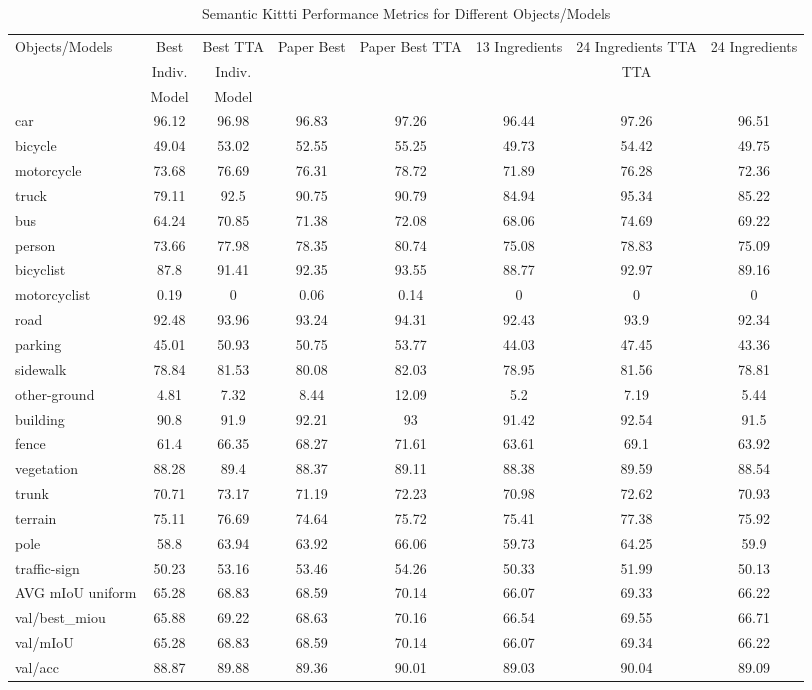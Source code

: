 \documentclass[10pt,twocolumn,letterpaper]{article}
\begin{document}
\begin{table}[htbp]
\centering
\small
	\caption{Semantic Kittti Performance Metrics for Different Objects/Models}
	\begin{tabular}{lccccccc}
		\toprule
		Objects/Models & Best & Best TTA & Paper Best & Paper Best TTA & 13 Ingredients & 24 Ingredients TTA & 24 Ingredients \\
		& Indiv. & Indiv. & & & & TTA & \\
		& Model & Model & & & & & \\
		\midrule
		car & 96.12 & 96.98 & 96.83 & 97.26 & 96.44 & 97.26 & 96.51 \\
		bicycle & 49.04 & 53.02 & 52.55 & 55.25 & 49.73 & 54.42 & 49.75 \\
		motorcycle & 73.68 & 76.69 & 76.31 & 78.72 & 71.89 & 76.28 & 72.36 \\
		truck & 79.11 & 92.5 & 90.75 & 90.79 & 84.94 & 95.34 & 85.22 \\
		bus & 64.24 & 70.85 & 71.38 & 72.08 & 68.06 & 74.69 & 69.22 \\
		person & 73.66 & 77.98 & 78.35 & 80.74 & 75.08 & 78.83 & 75.09 \\
		bicyclist & 87.8 & 91.41 & 92.35 & 93.55 & 88.77 & 92.97 & 89.16 \\
		motorcyclist & 0.19 & 0 & 0.06 & 0.14 & 0 & 0 & 0 \\
		road & 92.48 & 93.96 & 93.24 & 94.31 & 92.43 & 93.9 & 92.34 \\
		parking & 45.01 & 50.93 & 50.75 & 53.77 & 44.03 & 47.45 & 43.36 \\
		sidewalk & 78.84 & 81.53 & 80.08 & 82.03 & 78.95 & 81.56 & 78.81 \\
		other-ground & 4.81 & 7.32 & 8.44 & 12.09 & 5.2 & 7.19 & 5.44 \\
		building & 90.8 & 91.9 & 92.21 & 93 & 91.42 & 92.54 & 91.5 \\
		fence & 61.4 & 66.35 & 68.27 & 71.61 & 63.61 & 69.1 & 63.92 \\
		vegetation & 88.28 & 89.4 & 88.37 & 89.11 & 88.38 & 89.59 & 88.54 \\
		trunk & 70.71 & 73.17 & 71.19 & 72.23 & 70.98 & 72.62 & 70.93 \\
		terrain & 75.11 & 76.69 & 74.64 & 75.72 & 75.41 & 77.38 & 75.92 \\
		pole & 58.8 & 63.94 & 63.92 & 66.06 & 59.73 & 64.25 & 59.9 \\
		traffic-sign & 50.23 & 53.16 & 53.46 & 54.26 & 50.33 & 51.99 & 50.13 \\
		\midrule
		AVG mIoU uniform & 65.28 & 68.83 & 68.59 & 70.14 & 66.07 & 69.33 & 66.22 \\
		val/best\_miou & 65.88 & 69.22 & 68.63 & 70.16 & 66.54 & 69.55 & 66.71 \\
		val/mIoU & 65.28 & 68.83 & 68.59 & 70.14 & 66.07 & 69.34 & 66.22 \\
		val/acc & 88.87 & 89.88 & 89.36 & 90.01 & 89.03 & 90.04 & 89.09 \\
		\bottomrule
	\end{tabular}
\end{table}
\end{document}
